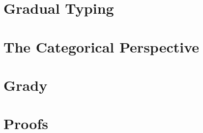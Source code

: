 \documentclass[preprint]{sigplanconf}
\begin{document}
\section{Gradual Typing}
\label{sec:gradual_typing}


\section{The Categorical Perspective}
\label{sec:categorical_perspective}


\section{Grady}
\label{sec:grady}


\nocite{*}



\appendix

\section{Proofs}
\label{sec:proofs}


\end{document}
